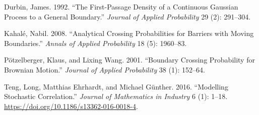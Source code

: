 \documentclass[
  english,
  10pt,
  letterpaper,
  DIV=11,
  numbers=noendperiod]{scrartcl}
\newlength{\cslhangindent}
\newenvironment{CSLReferences}[2] %
 {\begin{list}{}{%
  \setlength{\itemindent}{0pt}
  \setlength{\leftmargin}{0pt}
  \setlength{\parsep}{0pt}
  \ifodd #1
   \setlength{\leftmargin}{\cslhangindent}
   \setlength{\itemindent}{-1\cslhangindent}
  \fi
  \setlength{\itemsep}{#2\baselineskip}}}
 {\end{list}}
\begin{document}
\protect{}\label{refs}
\begin{CSLReferences}{1}{1}
Durbin, James. 1992. {``The First-Passage Density of a Continuous
Gaussian Process to a General Boundary.''} \emph{Journal of Applied
Probability} 29 (2): 291--304.

Kahalé, Nabil. 2008. {``Analytical Crossing Probabilities for Barriers
with Moving Boundaries.''} \emph{Annals of Applied Probability} 18 (5):
1960--83.

Pötzelberger, Klaus, and Lixing Wang. 2001. {``Boundary Crossing
Probability for Brownian Motion.''} \emph{Journal of Applied
Probability} 38 (1): 152--64.

Teng, Long, Matthias Ehrhardt, and Michael Günther. 2016. {``Modelling
Stochastic Correlation.''} \emph{Journal of Mathematics in Industry} 6
(1): 1--18. \url{https://doi.org/10.1186/s13362-016-0018-4}.

\end{CSLReferences}
\end{document}
